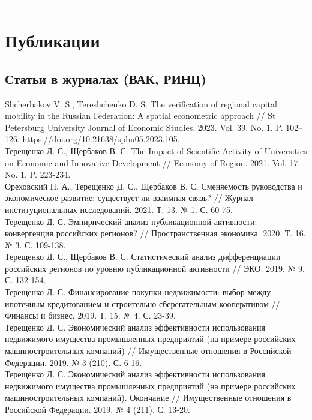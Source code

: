 \documentclass[10pt]{article}
\newcommand{\years}[1]{\marginnote{\scriptsize #1}}
\begin{document}
\vspace{2em}
\hrule


\section*{Публикации}

\subsection*{Статьи в журналах (ВАК, РИНЦ)}
\noindent
\years{2023}Shcherbakov  V.  S., Tereshchenko  D.  S.  The  verification  of  regional  capital  mobility in the Russian Federation: A spatial econometric approach // St Petersburg University Journal of Economic Studies. 2023. Vol. 39. No. 1. P. 102–126. \url{https://doi.org/10.21638/spbu05.2023.105}.\\
\years{2021}Терещенко Д. С., Щербаков В. С. The Impact of Scientific Activity of Universities on Economic and Innovative Development // Economy of Region. 2021. Vol. 17. No. 1. P. 223-234.\\
\years{2021}Ореховский П. А., Терещенко Д. С., Щербаков В. С. Сменяемость руководства и экономическое развитие: существует ли взаимная связь? // Журнал институциональных исследований. 2021. Т. 13. № 1. С. 60-75.\\
\years{2020}Терещенко Д. С. Эмпирический анализ публикационной активности: конвергенция российских регионов? // Пространственная экономика. 2020. Т. 16. № 3. С. 109-138.\\
\years{2019}Терещенко Д. С., Щербаков В. С. Статистический анализ дифференциации российских регионов по уровню публикационной активности // ЭКО. 2019. № 9. С. 132-154.\\
\years{2019}Терещенко Д. С. Финансирование покупки недвижимости: выбор между ипотечным кредитованием и строительно-сберегательным кооперативом // Финансы и бизнес. 2019. Т. 15. № 4. С. 23-39.\\
\years{2019}Терещенко Д. С. Экономический анализ эффективности использования недвижимого имущества промышленных предприятий (на примере российских машиностроительных компаний) // Имущественные отношения в Российской Федерации. 2019. № 3 (210). С. 6-16.\\
\years{2019}Терещенко Д. С. Экономический анализ эффективности использования недвижимого имущества промышленных предприятий (на примере российских машиностроительных компаний). Окончание // Имущественные отношения в Российской Федерации. 2019. № 4 (211). С. 13-20.\\
\end{document}
